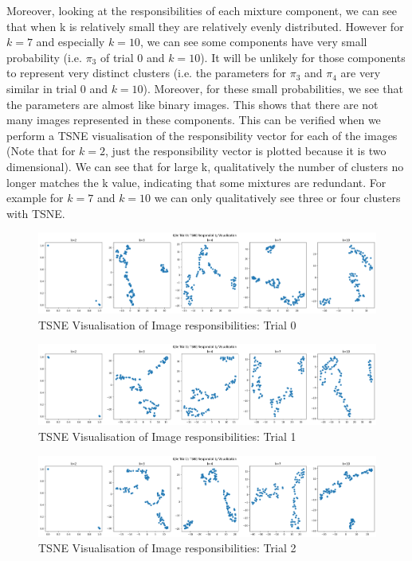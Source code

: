 \documentclass[12pt]{article}
\begin{document}
\begin{enumerate}
\newpage

Moreover, looking at the responsibilities of each mixture component, we can see that when k is relatively small they are relatively evenly distributed. However for $k=7$ and especially $k=10$, we can see some components have very small probability (i.e. $\pi_3$ of trial 0 and $k=10$). It will be unlikely for those components to represent very distinct clusters (i.e. the parameters for $\pi_3$ and $\pi_4$ are very similar in trial 0 and $k=10$). Moreover, for these small probabilities, we see that the parameters are almost like binary images. This shows that there are not many images represented in these components. This can be verified when we perform a TSNE visualisation of the responsibility vector for each of the images (Note that for $k=2$, just the responsibility vector is plotted because it is two dimensional). We can see that for large k, qualitatively the number of clusters no longer matches the k value, indicating that some mixtures are redundant. For example for $k=7$ and $k=10$ we can only qualitatively see three or four clusters with TSNE.

\begin{figure}[h]
  \centering
  \includegraphics[scale=0.35]{outputs/q3/q3e-0-tsne}
  \caption{TSNE Visualisation of Image responsibilities: Trial 0}
  \label{fig:3e-tsne-0}
\end{figure}
\begin{figure}[h]
  \centering
  \includegraphics[scale=0.35]{outputs/q3/q3e-1-tsne}
  \caption{TSNE Visualisation of Image responsibilities: Trial 1}
  \label{fig:3e-tsne-1}
\end{figure}
\begin{figure}[h]
  \centering
  \includegraphics[scale=0.35]{outputs/q3/q3e-2-tsne}
  \caption{TSNE Visualisation of Image responsibilities: Trial 2}
  \label{fig:3e-tsne-2}
\end{figure}
\newpage


\end{enumerate}
\end{document}
